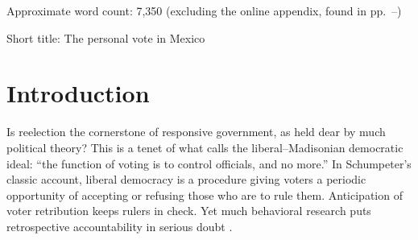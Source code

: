 \documentclass[letter,12pt]{article}
\begin{document}
\noindent Approximate word count: 7,350 (excluding the online appendix, found in pp.~\pageref{appendix}--\pageref{T:regs}) 

\noindent Short title: The personal vote in Mexico



\doublespacing

\section{Introduction}

Is reelection the cornerstone of responsive government, as held dear by much political theory? This is a tenet of what \citet[][:9]{riker.lib.pop.1978} calls the liberal--Madisonian democratic ideal: ``the function of voting is to control officials, and no more.'' In Schumpeter's \citeyearpar{schumpeter.1942} classic account, liberal democracy is a procedure giving voters a periodic opportunity of accepting or refusing those who are to rule them. Anticipation of voter retribution keeps rulers in check. Yet much behavioral research puts retrospective accountability in serious doubt \citep{achen.bartels.Dem.real.2016}.
\end{document}
